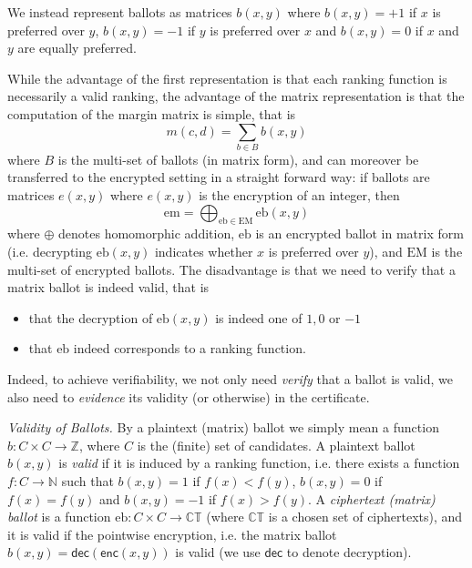 \documentclass{llncs}
\newcommand{\Nat}{\mathbb{N}}
\newcommand{\Z}{\mathbb{Z}}
\newcommand{\encb}{\mathrm{eb}}
\newcommand{\EncB}{\mathrm{EM}}
\newcommand{\encm}{\mathrm{em}}
\newcommand{\CT}{\mathbb{CT}}
\newcommand{\dec}{\mathsf{dec}}
\newcommand{\enc}{\mathsf{enc}}
\begin{document}
We instead represent ballots as matrices
$b(x, y)$ where $b(x, y) = +1$ if $x$ is preferred
over $y$, $b(x, y) = -1$ if $y$ is preferred over $x$ and $b(x, y) =
0$ if $x$ and $y$ are equally preferred.

While the advantage of the first representation is that each ranking
function is necessarily a valid ranking, the advantage of the matrix 
representation is that the computation of
the margin matrix is simple, that is
\[ m(c, d) = \sum_{b \in B} b(x, y) \]
where $B$ is the multi-set of ballots (in matrix form), and can
moreover be transferred to the encrypted setting in a straight
forward way: if ballots are matrices $e(x,y)$ where $e(x,y)$ is the
encryption of an integer, then
\[ \encm = \bigoplus_{\encb \in \EncB} \encb(x, y) \]
where $\oplus$ denotes homomorphic addition, $\encb$ is an encrypted
ballot in matrix form (i.e. decrypting $\encb(x, y)$ indicates
whether $x$ is preferred over $y$), and $\EncB$ is the multi-set of
encrypted ballots. The disadvantage is that we need to verify that a
matrix ballot is indeed valid, that is
\begin{itemize}
\item that the decryption of $\encb(x, y)$ is indeed one of $1, 0$ or
$-1$
\item that $\encb$ indeed corresponds to a ranking function.
\end{itemize}

Indeed, to achieve verifiability, we not only need \emph{verify}
that a ballot is valid, we also need to \emph{evidence} its validity
(or otherwise) in the certificate.  

\smallskip\noindent\emph{Validity of Ballots.} By a plaintext
(matrix) ballot
we simply mean a function $b: C \times C \to \Z$,
where $C$ is the (finite) set of candidates. A 
plaintext ballot $b(x, y)$ 
is \emph{valid} if it is induced by a ranking function, i.e.
there exists a function $f: C \to \Nat$ such that $b(x, y) = 1$ if
$f(x) < f(y)$, $b(x, y) = 0$ if $f(x) = f(y)$ and $b(x, y) = -1$ if
$f(x) > f(y)$. A \emph{ciphertext (matrix) ballot} is a function
$\encb: C \times C \to \CT$ (where $\CT$ is a chosen set of
ciphertexts), and it is valid if the pointwise encryption, i.e. the
matrix ballot $b(x, y) = \dec(\enc(x,y))$ is valid (we use $\dec$ to
denote decryption). 
\end{document}
